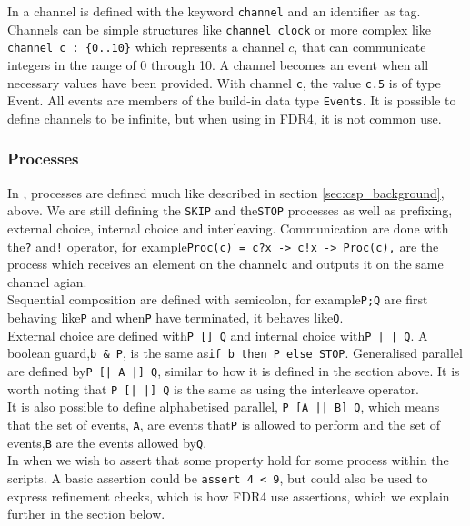 In \cspm{} a channel is defined with the keyword \texttt{channel} and an identifier as tag. Channels can be simple structures like \texttt{channel clock} or more complex like \texttt{channel c : \{0..10\}} which represents a channel $c$, that can communicate integers in the range of 0 through 10. A channel becomes an event when all necessary values have been provided. With channel \texttt{c}, the value \texttt{c.5} is of type Event. All events are members of the build-in data type \texttt{Events}. It is possible to define channels to be infinite, but when using \cspm{} in FDR4, it is not common use. \\

\subsubsection{\cspm{} Processes}
In \cspm{}, processes are defined much like described in section \ref{sec:csp_background}, above. We are still defining the \texttt{SKIP} and the\texttt{STOP} processes as well as prefixing, external choice, internal choice and interleaving. Communication are done with the\texttt{?} and\texttt{!} operator, for example\texttt{Proc(c) = c?x -> c!x -> Proc(c),} are the process which receives an element on the channel\texttt{c} and outputs it on the same channel agian. \\
Sequential composition are defined with semicolon, for example\texttt{P;Q} are first behaving like\texttt{P} and when\texttt{P} have terminated, it behaves like\texttt{Q}. \\
External choice are defined with\texttt{P [] Q} and internal choice with\texttt{P |~| Q}. A boolean guard,\texttt{b \& P}, is the same as\texttt{if b then P else STOP}.
Generalised parallel are defined by\texttt{P [| A |] Q}, similar to how it is defined in the section above. It is worth noting that \texttt{P [| {} |] Q} is the same as using the interleave operator. \\
It is also possible to define alphabetised parallel, \texttt{P [A || B] Q}, which means that the set of events, \texttt{A}, are events that\texttt{P} is allowed to perform and the set of events,\texttt{B} are the events allowed by\texttt{Q}.\\
In \cspm{} when we wish to assert that some property hold for some process within the \cspm{} scripts. A basic assertion could be \texttt{assert 4 < 9}, but could also be used to express refinement checks, which is how FDR4 use assertions, which we explain further in the section below.\\

